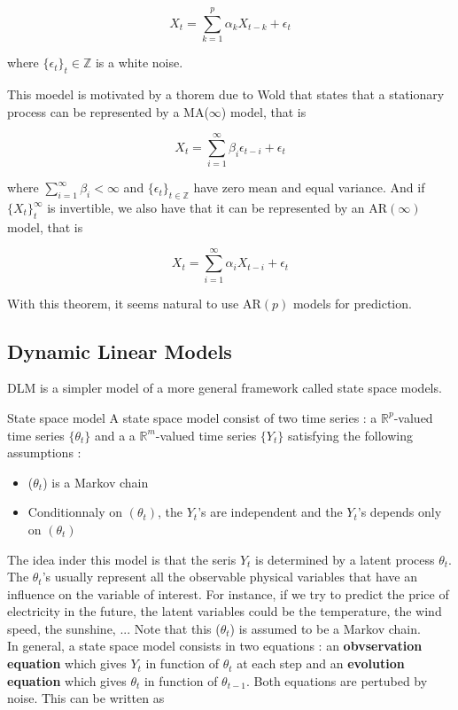 \documentclass{article}
\begin{document}
$$X_t = \sum_{k=1}^p \alpha_k X_{t-k} + \epsilon_t$$

where $\{ \epsilon_t \}_t \in \mathbb{Z}$ is a white noise.

This moedel is motivated by a thorem due to Wold that states that a stationary process can be represented by a MA($\infty$) model, that is

$$X_t = \sum_{i=1}^{\infty} \beta_i \epsilon_{t-i} + \epsilon_t$$

where $\sum_{i=1}^\infty \beta_i < \infty$ and $\{\epsilon_t\}_{t \in \mathbb{Z}}$ have zero mean and equal variance. And if $\{ X_t \}_t^\infty$ is invertible, we also have that it can be represented by an AR$(\infty)$ model, that is

$$X_t = \sum_{i=1}^{\infty} \alpha_i X_{t-i} + \epsilon_t$$

With this theorem, it seems natural to use AR$(p)$ models for prediction.

\subsection*{Dynamic Linear Models}
DLM is a simpler model of a more general framework called state space models. \\
\begin{definition}{State space model}
A state space model consist of two time series : a $\mathbb{R}^p$-valued time series $\{\theta_t\}$ and a a $\mathbb{R}^m$-valued time series $\{Y_t\}$ satisfying the following assumptions :

\begin{itemize}
        \item ($\theta_t$) is a Markov chain
        \item Conditionnaly on $(\theta_t)$, the $Y_t$'s are independent and the $Y_t$'s depends only on $(\theta_t)$
\end{itemize}
\end{definition}

The idea inder this model is that the seris $Y_t$ is determined by a latent process $\theta_t$. The $\theta_t$'s usually represent all the observable physical variables that have an influence on the variable of interest. For instance, if we try to predict the price of electricity in the future, the latent variables could be the temperature, the wind speed, the sunshine, ... Note that this ($\theta_t$) is assumed to be a Markov chain. \\

In general, a state space model consists in two equations : an \textbf{obvservation equation} which gives $Y_t$ in function of $\theta_t$ at each step and an \textbf{evolution equation} which gives $\theta_t$ in function of $\theta_{t-1}$. Both equations are pertubed by noise. This can be written as
\end{document}
